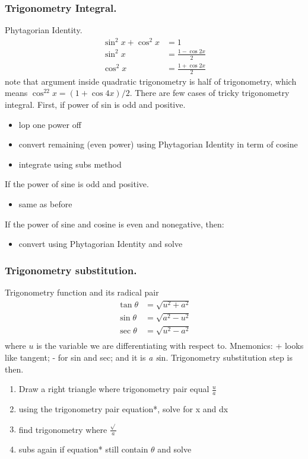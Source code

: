 \documentclass[../main.tex]{subfiles}
\begin{document}
\subsubsection*{Trigonometry Integral.} Phytagorian Identity.
\begin{align*}
    \sin^2x+\cos^2x&=1\\
    \sin^2x&=\frac{1-\cos 2x}{2}\\
    \cos^2x&=\frac{1+\cos2x}{2}
\end{align*}
note that argument inside quadratic trigonometry is half of trigonometry, which means $\cos^22x=(1+\cos 4x)/{2}$. There are few cases of tricky trigonometry integral. First, if power of sin is odd and positive.
\begin{itemize}
    \item lop one power off
    \item convert remaining (even power) using Phytagorian Identity in term of cosine 
    \item integrate using subs method
\end{itemize}
If the power of sine is odd and positive.
\begin{itemize}
    \item same as before
\end{itemize}
If the power of sine and cosine is even and nonegative, then:
\begin{itemize}
    \item convert using Phytagorian Identity and solve
\end{itemize}

\subsubsection*{Trigonometry substitution.} Trigonometry function and its radical pair
\begin{align*}
    \tan \theta&=\sqrt{u^2+a^2}\\
    \sin \theta&=\sqrt{a^2-u^2}\\
    \sec \theta&=\sqrt{u^2-a^2}\\
\end{align*}
where $u$ is the variable we are differentiating with respect to. Mnemonics: + looks like tangent; - for sin and sec; and it is \emph{a} \emph{s}in. Trigonometry substitution step is then.
\begin{enumerate}
    \item Draw a right triangle where trigonometry pair equal $\frac{u}{a}$
    \item using the trigonometry pair equation*, solve for x and dx
    \item find trigonometry where $\frac{\sqrt{}}{a}$
    \item subs again if equation* still contain $\theta$ and solve
\end{enumerate}
\end{document}
